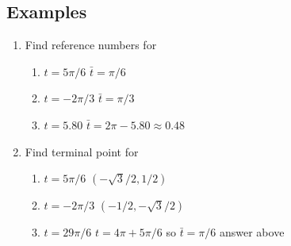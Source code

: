 \documentclass{tufte-handout}
\begin{document}
\subsection{Examples}
\begin{enumerate}
\item Find reference numbers for 
\begin{enumerate}
\item $t = 5\pi/6$ {\color{blue} $\bar{t} = \pi/6$}
\item $t = -2\pi/3$ {\color{blue} $\bar{t} = \pi/3$}
\item $t = 5.80$ {\color{blue} $\bar{t} = 2\pi - 5.80 \approx 0.48$}
\end{enumerate}
\item Find terminal point for
\begin{enumerate}
\item $t = 5\pi/6$ {\color{blue} $(-\sqrt{3}/2, 1/2)$}
\item $t = -2\pi/3$ {\color{blue} $(-1/2, -\sqrt{3}/2)$}
\item $t = 29\pi/6$ {\color{blue} $t = 4\pi + 5\pi/6$ so $\bar{t} = \pi/6$ answer above}
\end{enumerate}
\end{enumerate}
\end{document}
